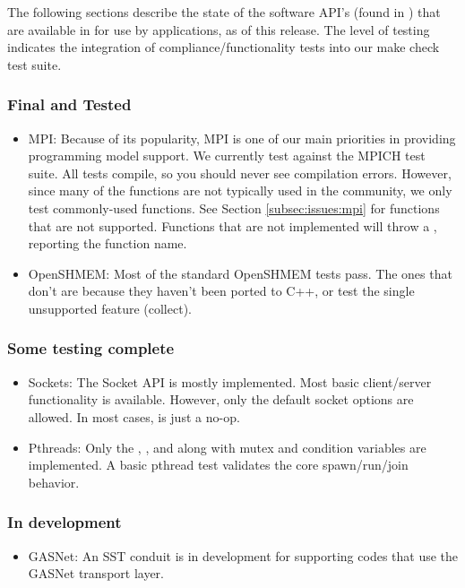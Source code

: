 The following sections describe the state of the software API's (found in ) that are available in \sstmacro for use by applications, as of this release. The level of testing indicates 
the integration of compliance/functionality tests into our make check test suite.  

\subsubsection{Final and Tested}
\label{subsubsec:intro:tested}

\begin{itemize}
\item{MPI:} Because of its popularity, MPI is one of our main priorities in providing programming model support.  
We currently test against the MPICH test suite. All tests compile, so you should never see compilation errors.  
However, since many of the functions are not typically used in the community, we only test commonly-used functions.   
See Section \ref{subsec:issues:mpi} for functions that are not supported.  
Functions that are not implemented will throw a , reporting the function name. 
\item{OpenSHMEM:} Most of the standard OpenSHMEM tests pass. The ones that don't are because they haven't been ported to C++, or test the single unsupported feature (collect). 
\end{itemize}

\subsubsection{Some testing complete}
\label{subsubsec:intro:sometesting}

\begin{itemize}
\item{Sockets:} The Socket API is mostly implemented. Most basic client/server functionality is available.  However, only the default socket options are allowed. In most cases,  is just a no-op.
\item{Pthreads:}  Only the , , and  along with mutex and condition variables are implemented.  A basic  pthread test validates the core spawn/run/join behavior.
\end{itemize}

\subsubsection{In development}
\label{subsubsec:intro:inutero}
\begin{itemize}
\item{GASNet:}  An SST conduit is in development for supporting codes that use the GASNet transport layer.
\end{itemize}

